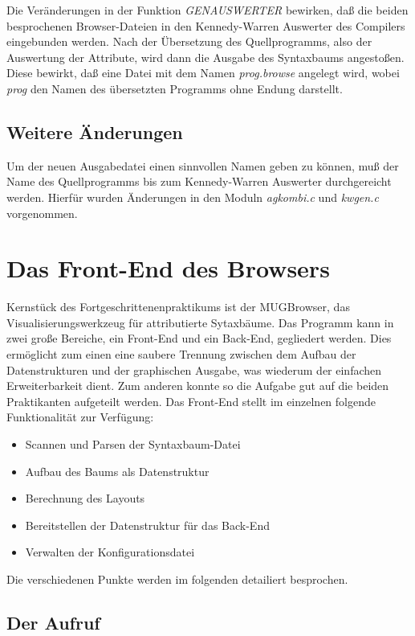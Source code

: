 Die Ver\"anderungen in der Funktion {\it GENAUSWERTER} bewirken, da\ss{} die beiden besprochenen Browser-Dateien in den Kennedy-Warren Auswerter des
Compilers eingebunden werden. Nach der \"Ubersetzung des Quellprogramms, also der Auswertung der Attribute, wird dann die Ausgabe des
Syntaxbaums angesto\ss{}en. Diese bewirkt, da\ss{} eine Datei mit dem Namen {\it prog.browse} angelegt wird, wobei {\it prog} den Namen des \"ubersetzten
Programms ohne Endung darstellt.

\section{Weitere \"Anderungen}

Um der neuen Ausgabedatei einen sinnvollen Namen geben zu k\"onnen, mu\ss{} der Name des Quellprogramms bis zum Kennedy-Warren Auswerter durchgereicht
werden. Hierf\"ur wurden \"Anderungen in den Moduln {\it agkombi.c} und {\it kwgen.c} vorgenommen.

\chapter{Das Front-End des Browsers}

Kernst\"uck des Fortgeschrittenenpraktikums ist der MUGBrowser, das Visualisierungswerkzeug f\"ur attributierte Sytaxb\"aume. Das Programm kann in zwei gro\ss{}e
Bereiche, ein Front-End und ein Back-End, gegliedert werden. Dies erm\"oglicht zum einen eine saubere Trennung zwischen dem Aufbau der Datenstrukturen
und der graphischen Ausgabe, was wiederum der einfachen Erweiterbarkeit dient. Zum anderen konnte so die Aufgabe gut auf die beiden Praktikanten
aufgeteilt werden.
Das Front-End stellt im einzelnen folgende Funktionalit\"at zur Verf\"ugung:

\begin{itemize}
\item{Scannen und Parsen der Syntaxbaum-Datei}
\item{Aufbau des Baums als Datenstruktur}
\item{Berechnung des Layouts}
\item{Bereitstellen der Datenstruktur f\"ur das Back-End}
\item{Verwalten der Konfigurationsdatei}
\end{itemize}

Die verschiedenen Punkte werden im folgenden detailiert besprochen.

\section{Der Aufruf}

